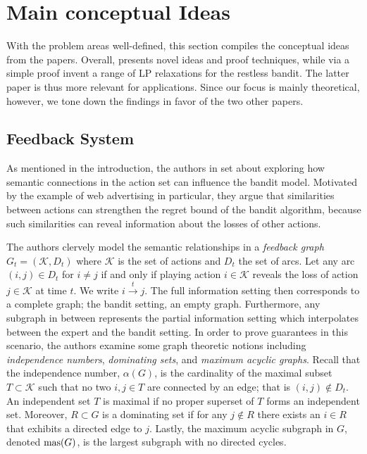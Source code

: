 \section{Main conceptual Ideas}
With the problem areas well-defined, this section compiles the conceptual ideas from the papers. Overall, \citep{alon, hazan} presents novel ideas and proof techniques, while \citep{bertsimas} via a simple proof invent a range of LP relaxations for the restless bandit. The latter paper is thus more relevant for applications. Since our focus is mainly theoretical, however, we tone down the findings \citep{bertsimas} in favor of the two other papers.

\subsection{Feedback System}
As mentioned in the introduction, the authors in \citep{alon} set about exploring how semantic connections in the action set can influence the bandit model. Motivated by the example of web advertising in particular, they argue that similarities between actions can strengthen the regret bound of the bandit algorithm, because such similarities can reveal information about the losses of other actions. 

The authors clervely model the semantic relationships in a \textit{feedback graph} $G_t=(\mathcal{K},D_t)$ where $\mathcal{K}$ is the set of actions and $D_t$ the set of arcs. Let any arc $(i,j)\in D_t$ for $i\not=j$ if and only if playing action $i\in\mathcal{K}$ reveals the loss of action $j\in \mathcal{K}$ at time $t$. We write $i\overset{t}{\to}j$. The full information setting then corresponds to a complete graph; the bandit setting, an empty graph. Furthermore, any subgraph in between represents the partial information setting which interpolates between the expert and the bandit setting. In order to prove guarantees in this scenario, the authors examine some graph theoretic notions including \textit{independence numbers}, \textit{dominating sets}, and \textit{maximum acyclic graphs}. Recall that the independence number, $\alpha(G)$, is the cardinality of the maximal subset $T\subset \mathcal{K}$ such that no two $i,j\in T$ are connected by an edge; that is $(i,j)\not\in D_t$. An independent set $T$ is maximal if no proper superset of $T$ forms an independent set. Moreover, $R\subset G$ is a dominating set if for any $j\not\in R$ there exists an $i\in R$ that exhibits a directed edge to $j$. Lastly, the maximum acyclic subgraph in $G$, denoted $\text{mas}(G)$, is the largest subgraph with no directed cycles. 

